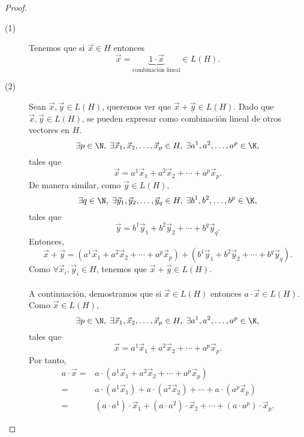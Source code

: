 \begin{proof}
\begin{description}
\item[(1)] Tenemos que si $\displaystyle \vec{x} \in H $ entonces
	\[ \vec{x} = \underbrace{1 \cdot \vec{x}}_{\text{combinación lineal}} \in L\left(H\right) .\]
\item[(2)] Sean $\displaystyle \vec{x}, \vec{y} \in L\left(H\right) $, queremos ver que $\displaystyle \vec{x} + \vec{y} \in L\left(H\right) $. Dado que $\displaystyle \vec{x}, \vec{y} \in L\left(H\right) $, se pueden expresar como combinación lineal de otros vectores en $\displaystyle H $. 
	\[\exists p \in \N,\; \exists \vec{x}_{1}, \vec{x}_{2}, \ldots, \vec{x}_{p} \in H, \;\exists a^{1}, a ^{2}, \ldots, a^{p} \in \K ,\]
	tales que 
	\[\vec{x} = a^{1}\vec{x}_{1} + a ^{2}\vec{x}_{2} + \cdots + a^{p}\vec{x}_{p} .\]
De manera similar, como $\displaystyle \vec{y}\in L\left(H\right) $, 
	\[\exists q \in \N,\; \exists \vec{y}_{1}, \vec{y}_{2}, \ldots, \vec{y}_{q} \in H,\; \exists b^{1}, b ^{2}, \ldots, b^{p} \in \K ,\]
	tales que
	\[\vec{y} = b^{1}\vec{y}_{1} + b^{2}\vec{y}_{2} + \cdots + b^{q}\vec{y}_{q} .\]
Entonces, 
\[\vec{x} + \vec{y} = \left(a^{1}\vec{x}_{1} + a ^{2}\vec{x}_{2} + \cdots + a^{p}\vec{x}_{p}\right)+ \left(b^{1}\vec{y}_{1} + b^{2}\vec{y}_{2} + \cdots + b^{q}\vec{y}_{q} \right) .\]
Como $\displaystyle \forall \vec{x}_{i}, \vec{y}_{i} \in H $, tenemos que $\displaystyle \vec{x} + \vec{y} \in L\left(H\right) $. \\ \\
A continuación, demostramos que si $\displaystyle \vec{x} \in L\left(H\right) $ entonces $\displaystyle a \cdot \vec{x} \in L\left(H\right) $. Como $\displaystyle \vec{x} \in L\left(H\right) $, 
\[\exists p \in \N,\; \exists \vec{x}_{1}, \vec{x}_{2}, \ldots, \vec{x}_{p} \in H, \;\exists a^{1}, a ^{2}, \ldots, a^{p} \in \K ,\]
tales que 
\[\vec{x} = a^{1}\vec{x}_{1} + a ^{2}\vec{x}_{2} + \cdots + a^{p}\vec{x}_{p} .\]
Por tanto, 
\[
\begin{split}
	a \cdot \vec{x} = & a \cdot \left(a^{1}\vec{x}_{1} + a ^{2}\vec{x}_{2} + \cdots + a^{p}\vec{x}_{p}\right) \\
	= & a \cdot \left(a^{1}\vec{x}_{1}\right) + a \cdot \left(a^{2}\vec{x}_{2}\right) + \cdots + a \cdot \left(a^{p}\vec{x}_{p}\right) \\
	= & \left(a \cdot a^{1}\right) \cdot \vec{x}_{1} + \left(a \cdot a^{2}\right) \cdot \vec{x}_{2} + \cdots + \left(a \cdot a ^{p}\right) \cdot \vec{x}_{p}  .
\end{split}
\]
\end{description}
\end{proof}

